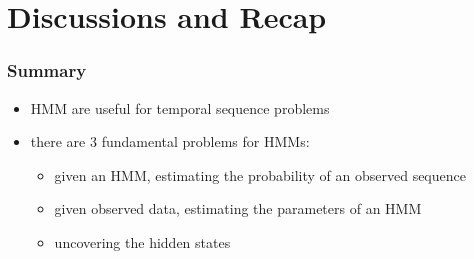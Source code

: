 \section{Discussions and Recap}
\label{sec:final}

\begin{frame}
  \frametitle{Summary}
  \begin{itemize}
  \item HMM are useful for temporal sequence problems
    \pause
  \item there are 3 fundamental problems for HMMs:
    \begin{itemize}
    \item<3-> given an HMM, estimating the probability of an observed sequence
    \item<4-> given observed data, estimating the parameters of an HMM
    \item<5-> uncovering the hidden states
    \end{itemize}

  \end{itemize}
\end{frame}